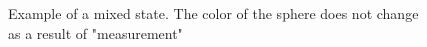 \begin{figure}
\centering



\caption{Example of a mixed state. The color of the sphere does not change as a result of "measurement"}
\label{figAddMixStateExample}
\end{figure}
